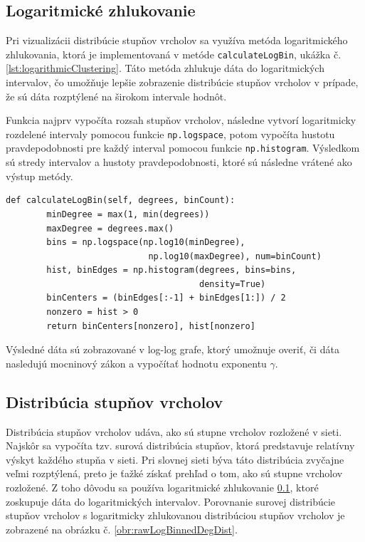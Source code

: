 \subsection{Logaritmické zhlukovanie}\label{sec:logarithmicClustering}

Pri vizualizácii distribúcie stupňov vrcholov sa využíva metóda logaritmického zhlukovania, ktorá je implementovaná
v metóde \texttt{calculateLogBin}, ukážka č. \ref{lst:logarithmicClustering}. Táto metóda zhlukuje dáta do logaritmických intervalov,
čo umožňuje lepšie zobrazenie distribúcie stupňov vrcholov v prípade, že sú dáta rozptýlené na širokom intervale hodnôt.

Funkcia najprv vypočíta rozsah stupňov vrcholov, následne vytvorí logaritmicky rozdelené intervaly pomocou funkcie \texttt{np.logspace},
potom vypočíta hustotu pravdepodobnosti pre každý interval pomocou funkcie \texttt{np.histogram}. Výsledkom sú stredy intervalov a
hustoty pravdepodobnosti, ktoré sú následne vrátené ako výstup metódy.

\begin{lstlisting}[caption={Metóda pre výpočet logaritmického zhlukovania.}, label={lst:logarithmicClustering}]
    def calculateLogBin(self, degrees, binCount):
        minDegree = max(1, min(degrees))
        maxDegree = degrees.max()
        bins = np.logspace(np.log10(minDegree), 
                            np.log10(maxDegree), num=binCount)
        hist, binEdges = np.histogram(degrees, bins=bins, 
                                      density=True)
        binCenters = (binEdges[:-1] + binEdges[1:]) / 2
        nonzero = hist > 0
        return binCenters[nonzero], hist[nonzero]
\end{lstlisting}

Výsledné dáta sú zobrazované v log-log grafe, ktorý umožnuje overiť, či dáta nasledujú mocninový zákon a vypočítať hodnotu exponentu
$\gamma$.

\subsection{Distribúcia stupňov vrcholov}\label{sec:degreeDistribution}

Distribúcia stupňov vrcholov udáva, ako sú stupne vrcholov rozložené v sieti. Najskôr sa vypočíta tzv. surová distribúcia stupňov,
ktorá predstavuje relatívny výskyt každého stupňa v sieti. Pri slovnej sieti býva táto distribúcia zvyčajne veľmi rozptýlená,
preto je ťažké získať prehľad o tom, ako sú stupne vrcholov rozložené. Z toho dôvodu sa používa logaritmické zhlukovanie \ref{sec:logarithmicClustering},
ktoré zoskupuje dáta do logaritmických intervalov. Porovnanie surovej distribúcie stupňov vrcholov s logaritmicky zhlukovanou distribúciou stupňov
vrcholov je zobrazené na obrázku č. \ref{obr:rawLogBinnedDegDist}.

